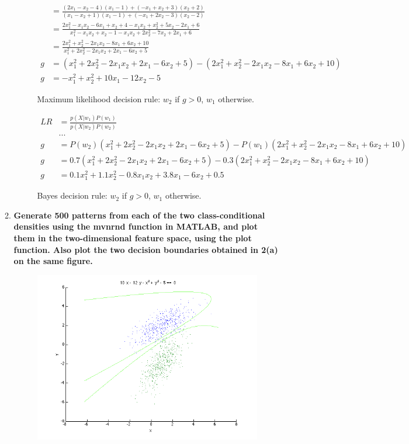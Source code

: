 \documentclass[12pt]{article}
\begin{document}
\begin{enumerate}
\begin{enumerate}
\begin{figure}[H]
\begin{equation}
\begin{split}
      & = \frac{(2x_1-x_2-4)(x_1-1)+(-x_1+x_2+3)(x_2+2)}{(x_1-x_2+1)(x_1-1)+(-x_1+2x_2-3)(x_2-2)} \\
      & = \frac{2x_1^2-x_1x_2-6x_1+x_2+4-x_1x_2+x_2^2+5x_2-2x_1+6}{x_1^2-x_1x_2+x_2-1-x_1x_2+2x_2^2-7x_2+2x_1+6} \\
      & = \frac{2x_1^2+x_2^2-2x_1x_2-8x_1+6x_2+10}{x_1^2+2x_2^2-2x_1x_2+2x_1-6x_2+5} \\
      g & = (x_1^2+2x_2^2-2x_1x_2+2x_1-6x_2+5)-(2x_1^2+x_2^2-2x_1x_2-8x_1+6x_2+10) \\
      g & = \boxed{-x_1^2+x_2^2+10x_1-12x_2-5}
    \end{split}
    \end{equation}
    \caption{Maximum likelihood decision rule: $w_2$ if $g > 0$, $w_1$ otherwise.}
    \end{figure}
    \begin{figure}[H]
    \begin{equation}
    \begin{split}
      LR& = \frac{p(X|w_1)P(w_1)}{p(X|w_2)P(w_2)} \\
      & ... \\
      g & = P(w_2)(x_1^2+2x_2^2-2x_1x_2+2x_1-6x_2+5)-P(w_1)(2x_1^2+x_2^2-2x_1x_2-8x_1+6x_2+10) \\
      g & = 0.7(x_1^2+2x_2^2-2x_1x_2+2x_1-6x_2+5)-0.3(2x_1^2+x_2^2-2x_1x_2-8x_1+6x_2+10) \\
      g & = \boxed{0.1x_1^2+1.1x_2^2-0.8x_1x_2+3.8x_1-6x_2+0.5}
    \end{split}
    \end{equation}
    \caption{Bayes decision rule: $w_2$ if $g > 0$, $w_1$ otherwise.}
    \end{figure}
  \item \textbf{Generate 500 patterns from each of the two class-conditional densities using the mvnrnd function in MATLAB, and plot them in the two-dimensional feature space, using the plot function. Also plot the two decision boundaries obtained in 2(a) on the same ﬁgure.}
    \begin{figure}[H]
      \includegraphics[width=\textwidth]{2b}

\end{figure}
\end{enumerate}
\end{enumerate}
\end{document}
